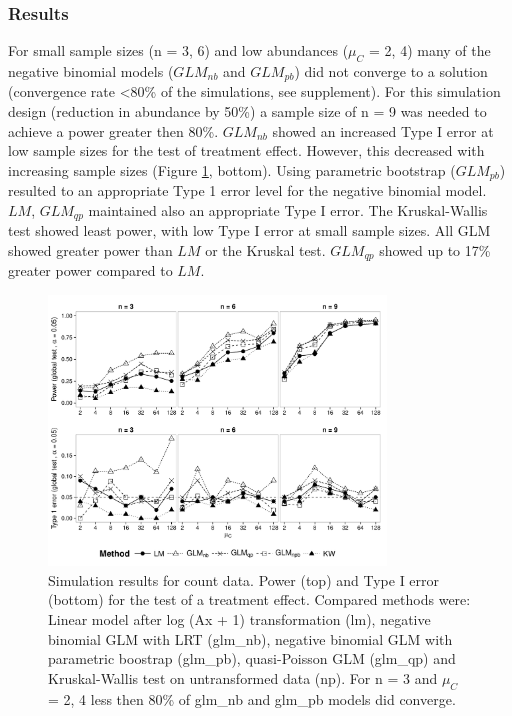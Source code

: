 \documentclass{scrartcl}
\begin{document}
\subsubsection{Results}
For small sample sizes (n = {3, 6}) and low abundances ($\mu_C$ = {2, 4}) many of the negative binomial models ($GLM_{nb}$ and $GLM_{pb}$) did not converge to a solution (convergence rate \textless 80\% of the simulations, see supplement).  
For this simulation design (reduction in abundance by 50\%) a sample size of n = 9 was needed to achieve a power greater then 80\%.
$GLM_{nb}$ showed an increased Type I error at low sample sizes for the test of treatment effect. 
However, this decreased with increasing sample sizes (Figure \ref{fig:p_glob_c}, bottom).
Using parametric bootstrap ($GLM_{pb}$) resulted to an appropriate Type 1 error level for the negative binomial model.
$LM$, $GLM_{qp}$ maintained also an appropriate Type I error.
The Kruskal-Wallis test showed least power, with low Type I error at small sample sizes. 
All GLM showed greater power than $LM$ or the Kruskal test. 
$GLM_{qp}$ showed up to 17\% greater power compared to $LM$.

\begin{figure}[h]
  \centering
  \includegraphics[width = 0.8\textwidth]{p_glob_c.pdf}
  \caption{Simulation results for count data. Power (top) and Type I error (bottom) for the test of a treatment effect. Compared methods were: Linear model after log (Ax + 1) transformation (lm), negative binomial GLM with LRT (glm\_nb), negative binomial GLM with parametric boostrap (glm\_pb), quasi-Poisson GLM (glm\_qp) and Kruskal-Wallis test on untransformed data (np).
  For n = 3 and $\mu_C$ = {2, 4} less then 80\% of glm\_nb and glm\_pb models did converge.}
  \label{fig:p_glob_c}
\end{figure}
\end{document}
